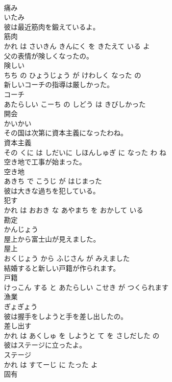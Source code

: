 \documentclass[8pt]{extreport}
\begin{document}
\begin{CJK}{UTF8}{min}
\\	痛み	
\\	いたみ		
\\	彼は最近筋肉を鍛えているよ。	
\\	筋肉 
\\	かれ は さいきん きんにく を きたえて いる よ			
\\	父の表情が険しくなったの。	
\\	険しい 
\\	ちち の ひょうじょう が けわしく なった の			
\\	新しいコーチの指導は厳しかった。	
\\	コーチ 
\\	あたらしい こーち の しどう は きびしかった			
\\	開会	
\\	かいかい		
\\	その国は次第に資本主義になったわね。	
\\	資本主義 
\\	その くに は しだいに しほんしゅぎ に なった わ ね			
\\	空き地で工事が始まった。	
\\	空き地 
\\	あきち で こうじ が はじまった			
\\	彼は大きな過ちを犯している。	
\\	犯す 
\\	かれ は おおき な あやまち を おかして いる			
\\	勘定	
\\	かんじょう		
\\	屋上から富士山が見えました。	
\\	屋上 
\\	おくじょう から ふじさん が みえました			
\\	結婚すると新しい戸籍が作られます。	
\\	戸籍 
\\	けっこん する と あたらしい こせき が つくられます			
\\	漁業	
\\	ぎょぎょう		
\\	彼は握手をしようと手を差し出したの。	
\\	差し出す 
\\	かれ は あくしゅ を しようと て を さしだした の			
\\	彼はステージに立ったよ。	
\\	ステージ 
\\	かれ は すてーじ に たった よ			
\\	固有	

\end{CJK}
\end{document}
